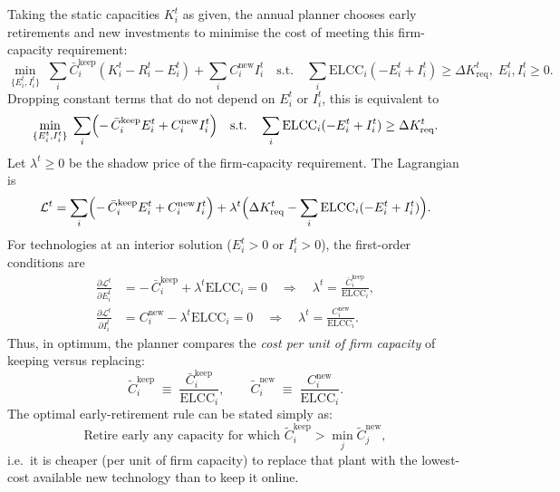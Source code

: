 \documentclass[preprint,authoryear,12pt]{elsarticle}
\begin{document}
Taking the static capacities $K_i^t$ as given, the annual planner chooses
early retirements and new investments to minimise the cost of meeting
this firm-capacity requirement:
\begin{equation}
\min_{\{E_i^t, I_i^t\}}
\;\sum_i \bar{C}_i^{\mathrm{keep}} (K_i^t - R_i^t - E_i^t)
   + \sum_i C_i^{\mathrm{new}} I_i^t
\quad
\text{s.t.}\quad
\sum_i \mathrm{ELCC}_i(-E_i^t + I_i^t)
\ge \Delta K_{\mathrm{req}}^t,
\;
E_i^t, I_i^t \ge 0.
\end{equation}
Dropping constant terms that do not depend on $E_i^t$ or $I_i^t$, this is
equivalent to
\begin{equation}
\min_{\{E_i^t, I_i^t\}}
\;\sum_i\Bigl(
-\,\bar{C}_i^{\mathrm{keep}} E_i^t
+ C_i^{\mathrm{new}} I_i^t
\Bigr)
\quad
\text{s.t.}\quad
\sum_i \mathrm{ELCC}_i(-E_i^t + I_i^t)
\ge \Delta K_{\mathrm{req}}^t.
\end{equation}
Let $\lambda^t \ge 0$ be the shadow price of the firm-capacity
requirement. The Lagrangian is
\begin{equation}
\mathcal{L}^t
=
\sum_i\Bigl(
-\,\bar{C}_i^{\mathrm{keep}} E_i^t
+ C_i^{\mathrm{new}} I_i^t
\Bigr)
+
\lambda^t
\Bigl(
\Delta K_{\mathrm{req}}^t
-
\sum_i \mathrm{ELCC}_i(-E_i^t + I_i^t)
\Bigr).
\end{equation}
For technologies at an interior solution ($E_i^t>0$ or $I_i^t>0$), the
first-order conditions are
\begin{align}
\frac{\partial \mathcal{L}^t}{\partial E_i^t}
&=
-\,\bar{C}_i^{\mathrm{keep}}
+ \lambda^t \mathrm{ELCC}_i
= 0
\quad\Rightarrow\quad
\lambda^t
=
\frac{\bar{C}_i^{\mathrm{keep}}}{\mathrm{ELCC}_i},
\\[0.5em]
\frac{\partial \mathcal{L}^t}{\partial I_i^t}
&=
C_i^{\mathrm{new}}
- \lambda^t \mathrm{ELCC}_i
= 0
\quad\Rightarrow\quad
\lambda^t
=
\frac{C_i^{\mathrm{new}}}{\mathrm{ELCC}_i}.
\end{align}
Thus, in optimum, the planner compares the \emph{cost per unit of firm
capacity} of keeping versus replacing:
\begin{equation}
\tilde{C}_i^{\mathrm{keep}}
\;\equiv\;
\frac{\bar{C}_i^{\mathrm{keep}}}{\mathrm{ELCC}_i},
\qquad
\tilde{C}_i^{\mathrm{new}}
\;\equiv\;
\frac{C_i^{\mathrm{new}}}{\mathrm{ELCC}_i}.
\end{equation}
The optimal early-retirement rule can be stated simply as:
\begin{equation}
\text{Retire early any capacity for which }
\tilde{C}_i^{\mathrm{keep}}
>\min_j \tilde{C}_j^{\mathrm{new}},
\end{equation}
i.e.\ it is cheaper (per unit of firm capacity) to replace that plant
with the lowest-cost available new technology than to keep it online.
\end{document}
